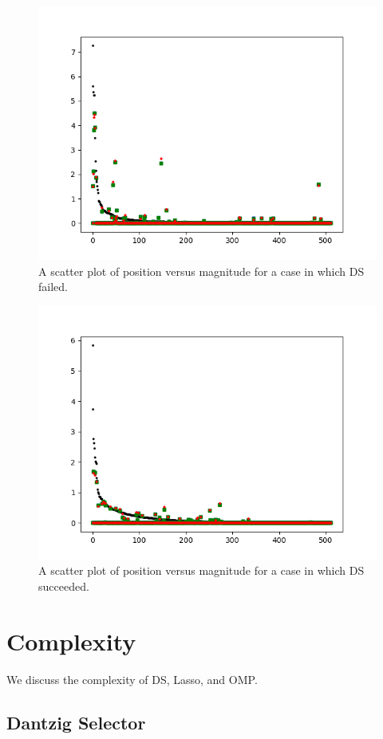 \bigskip
\begin {figure} [H]
\includegraphics [width = 0.8 \textwidth] {scatter-ddss-failure.png}
\caption {A scatter plot of position versus magnitude for a case in which DS failed.}
\end {figure}
%
\begin {figure} [H]
\includegraphics [width = 0.8 \textwidth] {scatter-ddss-success.png}
\caption {A scatter plot of position versus magnitude for a case in which DS succeeded.}
\end {figure}
\bigskip

\section {Complexity}

We discuss the complexity of DS, Lasso, and OMP.

\subsection {Dantzig Selector}

